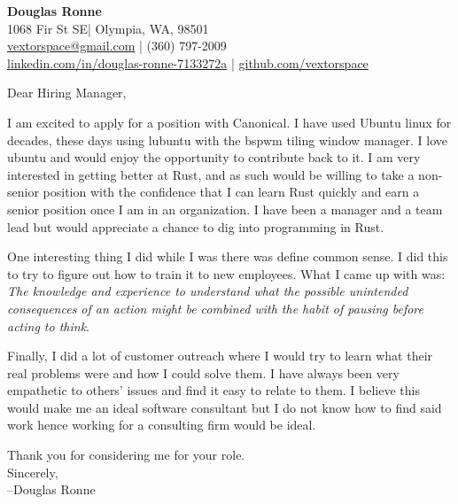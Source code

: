 \documentclass[letter,12pt]{article}
\begin{document}
\begin{center}
    {\Huge \textbf{Douglas Ronne}}\\
    \vspace{2mm}
    1068 Fir St SE| Olympia, WA, 98501\\
    \href{mailto:vextorspace@gmail.com}{vextorspace@gmail.com} | (360) 797-2009\\
    \href{www.linkedin.com/in/douglas-ronne-7133272a}{linkedin.com/in/douglas-ronne-7133272a} | \href{https://github.com/vextorspace}{github.com/vextorspace}
\end{center}

Dear Hiring Manager,

I am excited to apply for a position with Canonical. I have used Ubuntu linux for decades, these days using lubuntu with the bspwm tiling window manager. I love ubuntu and would enjoy the opportunity to contribute back to it. I am very interested in getting better at Rust, and as such would be willing to take a non-senior position with the confidence that I can learn Rust quickly and earn a senior position once I am in an organization. I have been a manager and a team lead but would appreciate a chance to dig into programming in Rust.

One interesting thing I did while I was there was define common sense. I did this to try to figure out how to train it to new employees. What I came up with was: \textit{The knowledge and experience to understand what the possible unintended consequences of an action might be combined with the habit of pausing before acting to think}.

Finally, I did a lot of customer outreach where I would try to learn what their real problems were and how I could solve them. I have always been very empathetic to others' issues and find it easy to relate to them. I believe this would make me an ideal software consultant but I do not know how to find said work hence working for a consulting firm would be ideal.

Thank you for considering me for your role.
\\
Sincerely,\\
--Douglas Ronne
\end{document}
